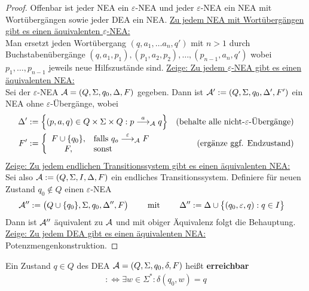 \begin{proof}
	Offenbar ist jeder NEA ein $\varepsilon$-NEA und jeder $\varepsilon$-NEA ein NEA mit Wortübergängen sowie jeder DEA ein NEA.\nl
	\underline{Zu jedem NEA mit Wortübergängen gibt es einen äquivalenten $\varepsilon$-NEA:}\\
	Man ersetzt jeden Wortübergang $(q,a_1,\ldots a_n,q')$ mit $n>1$ durch Buchstabenübergänge $(q,a_1,p_1),(p_1,a_2,p_2),\ldots,(p_{n-1},a_n,q')$ wobei $p_1,\ldots,p_{n-1}$ jeweils neue Hilfszustände sind.\nl	
	\underline{Zeige: Zu jedem $\varepsilon$-NEA gibt es einen äquivalenten NEA:}\\
	Sei der $\varepsilon$-NEA $\mathcal{A}=(Q,\Sigma,q_0,\Delta,F)$ gegeben.
	Dann ist $\mathcal{A}':=(Q,\Sigma,q_0,\Delta', F')$ ein NEA ohne $\varepsilon$-Übergänge, wobei
	\begin{align*}
		\Delta'&:=\left\lbrace (p,a,q)\in Q\times \Sigma\times Q:p\overset{a}{\longrightarrow}_{\mathcal{A}} q\right\rbrace &\text{(behalte alle nicht-$\varepsilon$-Übergänge)}\\
		F'&:=\left\lbrace\begin{array}{cl}
			F\cup\lbrace q_0\rbrace ,&\text{falls } q_o\overset{\varepsilon}{\longrightarrow}_{\mathcal{A}} F\\
			F ,&\text{sonst }
		\end{array}\right. &\text{(ergänze ggf. Endzustand)}
	\end{align*}
	\underline{Zeige: Zu jedem endlichen Transitionssystem gibt es einen äquivalenten NEA:}\\
	Sei also $\mathcal{A}:=(Q,\Sigma,I,\Delta,F)$ ein endliches Transitionssystem.
	Definiere für neuen Zustand $q_0\not\in Q$ einen $\varepsilon$-NEA
	\begin{align*}
		\mathcal{A}''&:=\big(Q\cup\lbrace q_0\rbrace,\Sigma,q_0,\Delta'',F\big)\qquad\text{ mit }\qquad
		\Delta'':=\Delta\cup\big\lbrace(q_0,\varepsilon,q):q\in I\big\rbrace
	\end{align*}
	Dann ist $\mathcal{A}''$ äquivalent zu $\mathcal{A}$ und mit obiger Äquivalenz folgt die Behauptung.\nl
	\underline{Zeige: Zu jedem DEA gibt es einen äquivalenten NEA:}\\
	Potenzmengenkonstruktion.
\end{proof}

\begin{definition}
	Ein Zustand $q\in Q$ des DEA $\mathcal{A}=(Q,\Sigma,q_0,\delta,F)$ heißt \textbf{erreichbar}
	\begin{align*}
		:\Longleftrightarrow\exists w\in\Sigma^\ast:\delta(q_0,w)=q
	\end{align*}
\end{definition}

